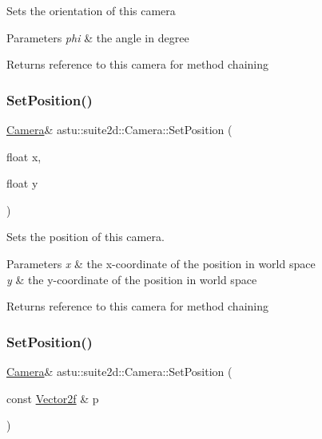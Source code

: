 Sets the orientation of this camera


\begin{DoxyParams}{Parameters}
{\em phi} & the angle in degree \\
\hline
\end{DoxyParams}
\begin{DoxyReturn}{Returns}
reference to this camera for method chaining 
\end{DoxyReturn}
\mbox{\label{classastu_1_1suite2d_1_1Camera_aad0053eb029496040349796201ed9d08}} 
\subsubsection{\texorpdfstring{Set\+Position()}{SetPosition()}\hspace{0.1cm}{\footnotesize\ttfamily [1/2]}}
{\footnotesize\ttfamily \hyperlink{classastu_1_1suite2d_1_1Camera}{Camera}\& astu\+::suite2d\+::\+Camera\+::\+Set\+Position (\begin{DoxyParamCaption}\item[{float}]{x,  }\item[{float}]{y }\end{DoxyParamCaption})}

Sets the position of this camera.


\begin{DoxyParams}{Parameters}
{\em x} & the x-\/coordinate of the position in world space \\
\hline
{\em y} & the y-\/coordinate of the position in world space \\
\hline
\end{DoxyParams}
\begin{DoxyReturn}{Returns}
reference to this camera for method chaining 
\end{DoxyReturn}
\mbox{\label{classastu_1_1suite2d_1_1Camera_aada7d3c66378ebe95f7464be6ee516e6}} 
\subsubsection{\texorpdfstring{Set\+Position()}{SetPosition()}\hspace{0.1cm}{\footnotesize\ttfamily [2/2]}}
{\footnotesize\ttfamily \hyperlink{classastu_1_1suite2d_1_1Camera}{Camera}\& astu\+::suite2d\+::\+Camera\+::\+Set\+Position (\begin{DoxyParamCaption}\item[{const \hyperlink{classastu_1_1Vector2}{Vector2f} \&}]{p }\end{DoxyParamCaption})\hspace{0.3cm}{\ttfamily [inline]}}

